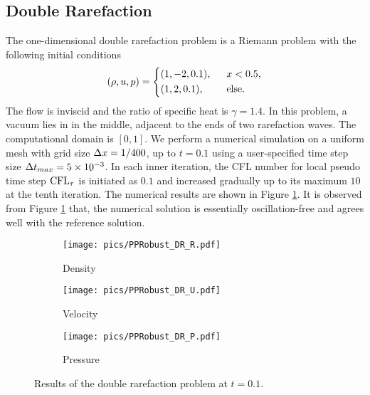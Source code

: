 \subsection{Double Rarefaction}

The one-dimensional double rarefaction problem \cite{hu2004kineticDoubleRare} 
is a Riemann problem with the following initial conditions
\begin{equation}
    (\rho,u,p) = \begin{dcases}
    	 (1,-2,0.1),\ \ & x < 0.5,\\
    	(1,2,0.1),\ \ &  \mathrm{else}.
    \end{dcases}
\end{equation}
The flow is inviscid and the ratio of specific heat is $\gamma=1.4$.
In this problem, a vacuum lies in in the middle, adjacent to the ends of two rarefaction waves.
The computational domain is $[0,1]$.
We perform a numerical simulation on a uniform mesh with grid size $\mathrm\Delta x = 1/400$, up to $t=0.1$ using a user-specified time step size $\mathrm\Delta t_{max}= 5 \times 10 ^{-3}$.
In each inner iteration, the CFL number for local pseudo time step $\text{CFL}_\tau$ is initiated as $0.1$ and increased gradually up to its maximum $10$ at the tenth iteration. 
The numerical results are shown in Figure \ref{fig:doubleRare}. It is observed from Figure \ref{fig:doubleRare} that, the numerical solution is essentially oscillation-free and agrees well with the reference solution.

\begin{figure}[htbp]
    \centering
    \begin{subfigure}{0.33\textwidth}
        \texttt{[image: pics/PPRobust\_DR\_R.pdf]}
        \caption[]{Density}
    \end{subfigure}\hfill
    \begin{subfigure}{0.33\textwidth}
        \texttt{[image: pics/PPRobust\_DR\_U.pdf]}
        \caption[]{Velocity}
    \end{subfigure}\hfill
    \begin{subfigure}{0.33\textwidth}
        \texttt{[image: pics/PPRobust\_DR\_P.pdf]}
        \caption[]{Pressure}
    \end{subfigure}
    \caption{Results of the double rarefaction problem at $t=0.1$.}
    \label{fig:doubleRare}
\end{figure}

